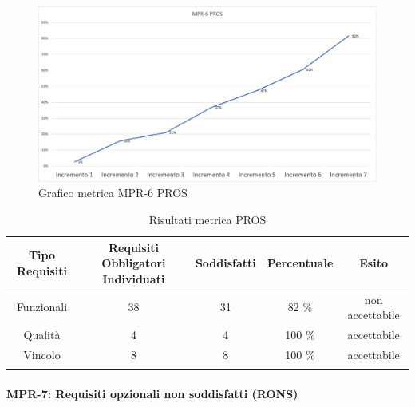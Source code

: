 \begin{center}
        \begin{figure}[!htb]
        \centering
        \includegraphics[scale=0.40]{res/images/RQPROS.png}
        \caption{Grafico metrica MPR-6 PROS}
    \end{figure}
    \begin{center}
    \end{center}
\end{center}

\begin{center}
    \begin{longtable}{|c|c|c|c|c|}
        \hline
        \rowcolor{lighter-grayer}
        \textbf {Tipo Requisiti} & \textbf{Requisiti Obbligatori Individuati} & \textbf{Soddisfatti} & \textbf{Percentuale} & \textbf{Esito} \\
        \hline
        \endfirsthead

        \hline
        Funzionali & 38 & 31 & 82 \%  & non accettabile                \\
        Qualità & 4 & 4 & 100 \% & accettabile                         \\
        Vincolo & 8 & 8 & 100 \% & accettabile                          \\     
        \hline
        \rowcolor{white}
        \caption{Risultati metrica PROS}
    \end{longtable}
\end{center}




\newpage
\paragraph{MPR-7: Requisiti opzionali non soddisfatti (RONS)}\label{_SV}


